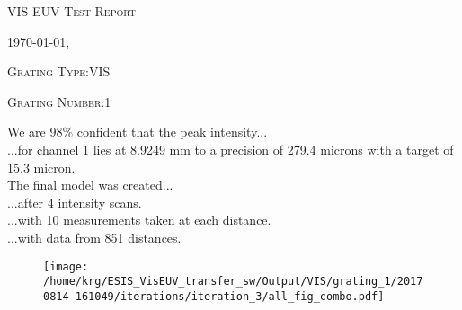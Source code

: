 \documentclass[12pt,a4paper]{article}
\begin{document}
\begin{center}
{\scshape\LARGE VIS-EUV Test Report \par}
{\scshape\Large \today, \currenttime \par}
\bigskip
{\scshape\large Grating Type:VIS \par}
{\scshape\large Grating Number:1 \par}
\end{center}
\noindent We are 98\% confident that the peak intensity...\\
\indent...for channel 1 lies at 8.9249 mm to a precision of 279.4 microns with a target of 15.3 micron.\\
\noindent The final model was created...\\
\indent...after 4 intensity scans.\\
\indent...with 10 measurements taken at each distance.\\
\indent...with data from 851 distances.\\
\begin{figure}[H]
\centering
\texttt{[image: /home/krg/ESIS\_VisEUV\_transfer\_sw/Output/VIS/grating\_1/20170814-161049/iterations/iteration\_3/all\_fig\_combo.pdf]}\\
\end{figure}
\end{document}
